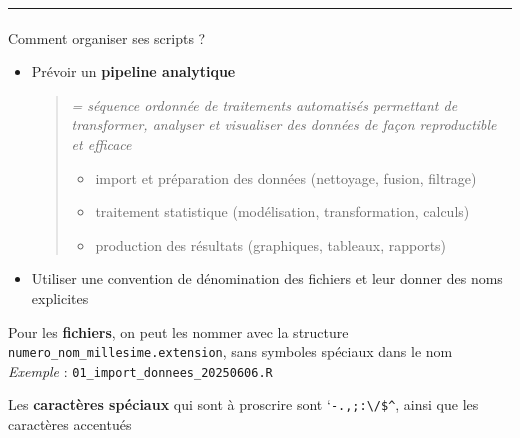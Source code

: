\documentclass[
  french,
  10pt,
  a4paper,
]{article}
\makeatletter
\let\oldparagraph\paragraph
\renewcommand{\paragraph}{
    \@ifstar
      \xxxParagraphStar
      \xxxParagraphNoStar
  }
\newcommand{\xxxParagraphStar}[1]{\oldparagraph*{#1}\mbox{}}
\newcommand{\xxxParagraphNoStar}[1]{\oldparagraph{#1}\mbox{}}
\providecommand{\tightlist}{%
  \setlength{\itemsep}{0pt}\setlength{\parskip}{0pt}}
\makeatother
\begin{document}
\begin{center}\rule{0.5\linewidth}{0.5pt}\end{center}

\paragraph{Comment organiser ses scripts
?}\label{comment-organiser-ses-scripts}

\begin{itemize}
\item
  Prévoir un \textbf{pipeline analytique}

  \begin{quote}
  \emph{= séquence ordonnée de traitements automatisés permettant de
  transformer, analyser et visualiser des données de façon reproductible
  et efficace}

  \begin{itemize}
  \tightlist
  \item
    import et préparation des données (nettoyage, fusion, filtrage)\\
  \item
    traitement statistique (modélisation, transformation, calculs)\\
  \item
    production des résultats (graphiques, tableaux, rapports)
  \end{itemize}
  \end{quote}
\item
  Utiliser une convention de dénomination des fichiers et leur donner
  des noms explicites
\end{itemize}

\begin{tcolorbox}[enhanced jigsaw, arc=.35mm, bottomrule=.15mm, breakable, colback=white, colframe=quarto-callout-tip-color-frame, left=2mm, leftrule=.75mm, opacityback=0, rightrule=.15mm, toprule=.15mm]
\begin{minipage}[t]{5.5mm}
\textcolor{quarto-callout-tip-color}{\faLightbulb}
\end{minipage}%
\begin{minipage}[t]{\textwidth - 5.5mm}

Pour les \textbf{fichiers}, on peut les nommer avec la structure
\texttt{numero\_nom\_millesime.extension}, sans symboles spéciaux dans
le nom\\
\emph{Exemple} : \texttt{01\_import\_donnees\_20250606.R}

Les \textbf{caractères spéciaux} qui sont à proscrire sont
`\texttt{-.,;:\textbackslash{}/\$\^{}}, ainsi que les caractères
accentués

\end{minipage}%
\end{tcolorbox}
\end{document}
